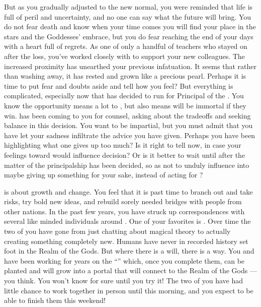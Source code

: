 \documentclass[char]{GL2020}
\begin{document}
But as you gradually adjusted to the new normal, you were reminded that life is full of peril and uncertainty, and no one can say what the future will bring. You do not fear death and know when your time comes you will find your place in the stars and the Goddesses’ embrace, but you do fear reaching the end of your days with a heart full of regrets. As one of only a handful of teachers who stayed on after the loss, you’ve worked closely with \cMusic{} to support your new colleagues. The increased proximity has unearthed your previous infatuation. It seems that rather than washing away, it has rested and grown like a precious pearl. Perhaps it is time to put fear and doubts aside and tell \cMusic{\them} how you feel? But everything is complicated, especially now that \cMusic{} has decided to run for Principal of the \pSchool{}. You know the opportunity means a lot to \cMusic{\them}, but also means \cMusic{\they} will be immortal if they win. \cMusic{} has been coming to you for counsel, asking about the tradeoffs and seeking balance in this decision. You want to be impartial, but you must admit that you have let your sadness infiltrate the advice you have given. Perhaps you have been highlighting what one gives up too much? Is it right to tell \cMusic{} now, in case your feelings toward \cMusic{\them} would influence \cMusic{\their} decision? Or is it better to wait until after the matter of the principalship has been decided, so as not to unduly influence \cMusic{\them} into maybe giving up something for your sake, instead of acting for \cMusic{\themself}?

\cFlow{} is about growth and change. You feel that it is past time to branch out and take risks, try bold new ideas, and rebuild sorely needed bridges with people from other nations. In the past few years, you have struck up correspondences with several like minded individuals around \pEarth{}. One of your favorites is \cCurse{\intro}. Over time the two of you have gone from just chatting about magical theory to actually creating something completely new. Humans have never in recorded history set foot in the Realm of the Gods. But where there is a will, there is a way. You and \cCurse{} have been working for years on the ``\iBeansMB{}'' which, once you complete them, can be planted and will grow into a portal that will connect \pEarth{} to the Realm of the Gods — you think. You won't know for sure until you try it! The two of you have had little chance to work together in person until this morning, and you expect to be able to finish them this weekend! 
\end{document}
